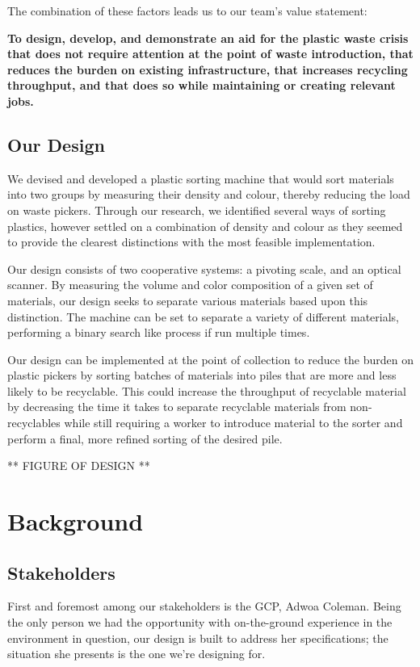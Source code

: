 \documentclass[12pt]{article}
\begin{document}
\begin{multicols*}{2}
            The combination of these factors leads us to our team's value statement:

            \textbf{To design, develop, and demonstrate an aid for the plastic waste crisis that does not require attention at the point of waste introduction, that reduces the burden on existing infrastructure, that increases recycling throughput, and that does so while maintaining or creating relevant jobs. }

        \subsection{Our Design}
            We devised and developed a plastic sorting machine that would sort materials into two groups by measuring their density and colour, thereby reducing the load on waste pickers. Through our research, we identified several ways of sorting plastics, however settled on a combination of density and colour as they seemed to provide the clearest distinctions \cite{gent2009recycling} \cite{safavi2010sorting} \cite{bruno2000automated} with the most feasible implementation. 
            
            Our design consists of two cooperative systems: a pivoting scale, and an optical scanner. By  measuring the volume and color composition of a given set of materials, our design seeks to separate various materials based upon this distinction. The machine can be set to separate a variety of different materials, performing a binary search like process if run multiple times.

            Our design can be implemented at the point of collection to reduce the burden on plastic pickers by sorting batches of materials into piles that are more and less likely to be recyclable. This could increase the throughput of recyclable material by decreasing the time it takes to separate recyclable materials from non-recyclables while still requiring a worker to introduce material to the sorter and perform a final, more refined sorting of the desired pile.

            ** FIGURE OF DESIGN **

    \section{Background}
        \subsection{Stakeholders}
            First and foremost among our stakeholders is the GCP, Adwoa Coleman. Being the only person we had the opportunity with on-the-ground experience in the environment in question, our design is built to address her specifications; the situation she presents is the one we're designing for.
            

\end{multicols*}
\end{document}
